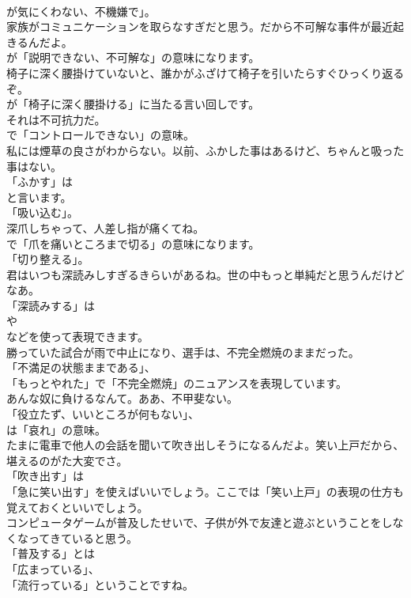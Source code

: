 \documentclass[8pt]{extreport}
\begin{document}
\begin{CJK}{UTF8}{min}
\\	が気にくわない、不機嫌で」。	
\\	家族がコミュニケーションを取らなすぎだと思う。だから不可解な事件が最近起きるんだよ。 
\\	が「説明できない、不可解な」の意味になります。	
\\	椅子に深く腰掛けていないと、誰かがふざけて椅子を引いたらすぐひっくり返るぞ。 
\\	が「椅子に深く腰掛ける」に当たる言い回しです。	
\\	それは不可抗力だ。 
\\	で「コントロールできない」の意味。	
\\	私には煙草の良さがわからない。以前、ふかした事はあるけど、ちゃんと吸った事はない。 
\\	「ふかす」は
\\	と言います。
\\	「吸い込む」。	
\\	深爪しちゃって、人差し指が痛くてね。 
\\	で「爪を痛いところまで切る」の意味になります。
\\	「切り整える」。	
\\	君はいつも深読みしすぎるきらいがあるね。世の中もっと単純だと思うんだけどなあ。 
\\	「深読みする」は
\\	や
\\	などを使って表現できます。	
\\	勝っていた試合が雨で中止になり、選手は、不完全燃焼のままだった。 
\\	「不満足の状態ままである」、
\\	「もっとやれた」で「不完全燃焼」のニュアンスを表現しています。	
\\	あんな奴に負けるなんて。ああ、不甲斐ない。 
\\	「役立たず、いいところが何もない」、
\\	は「哀れ」の意味。	
\\	たまに電車で他人の会話を聞いて吹き出しそうになるんだよ。笑い上戸だから、堪えるのがた大変でさ。 
\\	「吹き出す」は
\\	「急に笑い出す」を使えばいいでしょう。ここでは「笑い上戸」の表現の仕方も覚えておくといいでしょう。	
\\	コンピュータゲームが普及したせいで、子供が外で友達と遊ぶということをしなくなってきていると思う。 
\\	「普及する」とは
\\	「広まっている」、
\\	「流行っている」ということですね。	

\end{CJK}
\end{document}
